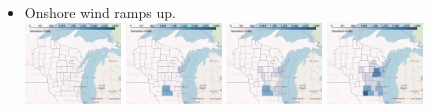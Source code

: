 \documentclass[xcolor=dvipsnames]{beamer}
\begin{document}
\begin{frame}
\begin{itemize}
\item Onshore wind ramps up.\\
  \includegraphics[width=0.2\textwidth]{includes/no_leakage_shutdowns_wind_r0.png}
  \includegraphics[width=0.2\textwidth]{includes/no_leakage_shutdowns_wind_r2.png}
  \includegraphics[width=0.2\textwidth]{includes/no_leakage_shutdowns_wind_r3.png}
  \includegraphics[width=0.2\textwidth]{includes/no_leakage_shutdowns_wind_r4.png}


\end{itemize}
\end{frame}
\end{document}
